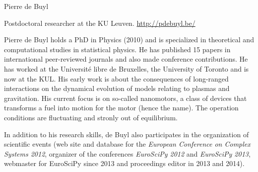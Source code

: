 \begin{participant}[type=R,PM=12,gender=male,salary=5500]{Pierre de Buyl}

Postdoctoral researcher at the KU Leuven. \url{http://pdebuyl.be/}

Pierre de Buyl holds a PhD in Physics (2010) and is specialized in theoretical and
computational studies in statistical physics. He has published 15 papers in international
peer-reviewed journals and also made conference contributions. He has worked at the
Université libre de Bruxelles, the University of Toronto and is now at the KUL.
%
His early work is about the consequences of long-ranged interactions on the dynamical
evolution of models relating to plasmas and gravitation.
%
His current focus is on so-called nanomotors, a class of devices that transforms a fuel into
motion for the motor (hence the name). The operation conditions are fluctuating and stronly
out of equilibrium.

In addition to his research skills, de Buyl also participates in the organization of
scientific events (web site and database for the {\em European Conference on Complex Systems
  2012}, organizer of the conferences {\em EuroSciPy 2012} and {\em EuroSciPy 2013},
webmaster for EuroSciPy since 2013 and proceedings editor in 2013 and 2014).

\end{participant}
